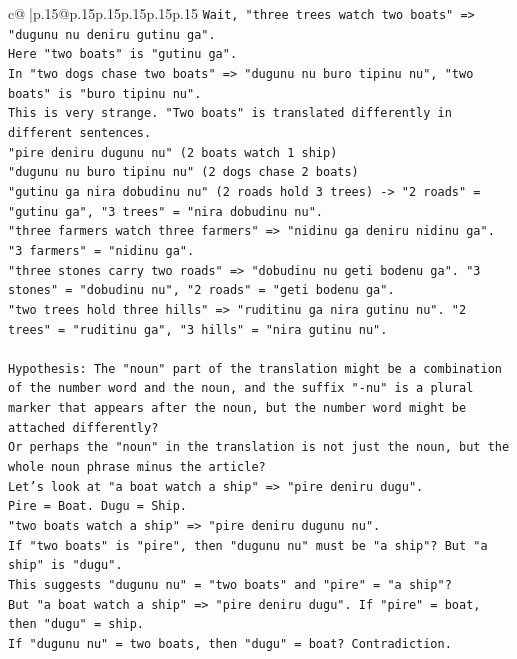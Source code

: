 \documentclass{article}
\begin{document}
{\begin{supertabular}{c@{$\;$}|p{.15\linewidth}@{}p{.15\linewidth}p{.15\linewidth}p{.15\linewidth}p{.15\linewidth}p{.15\linewidth}}
{{{\texttt{Wait, "three trees watch two boats" => "dugunu nu deniru gutinu ga".} \\
\texttt{Here "two boats" is "gutinu ga".} \\
\texttt{In "two dogs chase two boats" => "dugunu nu buro tipinu nu", "two boats" is "buro tipinu nu".} \\
\texttt{This is very strange. "Two boats" is translated differently in different sentences.} \\
\texttt{"pire deniru dugunu nu" (2 boats watch 1 ship)} \\
\texttt{"dugunu nu buro tipinu nu" (2 dogs chase 2 boats)} \\
\texttt{"gutinu ga nira dobudinu nu" (2 roads hold 3 trees) {-}> "2 roads" = "gutinu ga", "3 trees" = "nira dobudinu nu".} \\
\texttt{"three farmers watch three farmers" => "nidinu ga deniru nidinu ga". "3 farmers" = "nidinu ga".} \\
\texttt{"three stones carry two roads" => "dobudinu nu geti bodenu ga". "3 stones" = "dobudinu nu", "2 roads" = "geti bodenu ga".} \\
\texttt{"two trees hold three hills" => "ruditinu ga nira gutinu nu". "2 trees" = "ruditinu ga", "3 hills" = "nira gutinu nu".} \\
\\ 
\texttt{Hypothesis: The "noun" part of the translation might be a combination of the number word and the noun, and the suffix "{-}nu" is a plural marker that appears after the noun, but the number word might be attached differently?} \\
\texttt{Or perhaps the "noun" in the translation is not just the noun, but the whole noun phrase minus the article?} \\
\texttt{Let's look at "a boat watch a ship" => "pire deniru dugu".} \\
\texttt{Pire = Boat. Dugu = Ship.} \\
\texttt{"two boats watch a ship" => "pire deniru dugunu nu".} \\
\texttt{If "two boats" is "pire", then "dugunu nu" must be "a ship"? But "a ship" is "dugu".} \\
\texttt{This suggests "dugunu nu" = "two boats" and "pire" = "a ship"?} \\
\texttt{But "a boat watch a ship" => "pire deniru dugu". If "pire" = boat, then "dugu" = ship.} \\
\texttt{If "dugunu nu" = two boats, then "dugu" = boat? Contradiction.} \\
}}}
\end{supertabular}}
\end{document}
